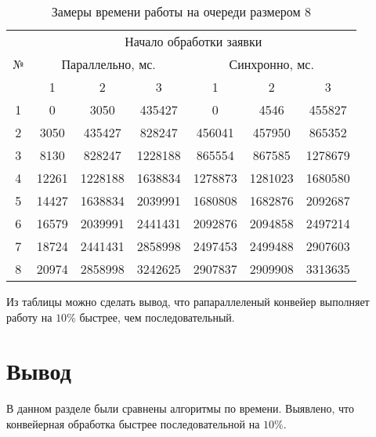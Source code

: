 \begin{table}[ht!]
	\begin{center}
		\captionsetup{justification=raggedright,singlelinecheck=off}
		\caption{Замеры времени работы на очереди размером 8}
		\label{tbl:best}
		\begin{tabular}{|c|c|c|c|c|c|c|}
			\hline
			\multirow{3}{*}{№} & \multicolumn{6}{c|}{Начало обработки заявки} \\ \cline{2-7} 
			& \multicolumn{3}{c|}{Параллельно, мс.} & \multicolumn{3}{c|}{Синхронно, мс.} \\ \cline{2-7} 
			& 1 & 2 & 3 & 1 & 2 & 3 \\ \hline
			1   & 0          & 3050      & 435427     & 0          & 4546     & 455827      \\
			2   & 3050      & 435427     &   828247   &   456041    &  457950    &  865352  \\
			3   &   8130    &  828247    & 1228188     &   865554    &  867585   &  1278679    \\
			4   &   12261   &   1228188   &   1638834   &  1278873    &  1281023    &  1680580   \\
			5   &   14427   &  1638834    &  2039991    &  1680808   &  1682876    &  2092687    \\
			6   &   16579   &  2039991    &  2441431    &  2092876    &  2094858    &  2497214    \\
			7   &   18724   &  2441431    &   2858998   &  2497453    &  2499488   &   2907603   \\
			8   &   20974   &   2858998   &  3242625    &  2907837   &   2909908   &   3313635   \\
			\hline
		\end{tabular}
	\end{center}
\end{table}

\FloatBarrier

Из таблицы можно сделать вывод, что рапараллеленый  конвейер выполняет работу на $10\%$ быстрее, чем последовательный.

\section*{Вывод}

В данном разделе были сравнены алгоритмы по времени. Выявлено, что конвейерная обработка быстрее последовательной на $10\%$.